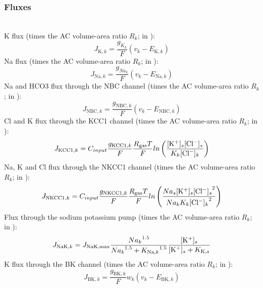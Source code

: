 \subsubsection*{Fluxes}\label{sec:EqNeAcflux}~\\ 
%
\gls{K} flux (times the AC volume-area ratio $R_k$; in \uMmps): 
\begin{equation} \label{eq:J_K}
J_{\text{K},k}=\frac{g_{K_{k}}}{F}(v_k - E_{\text{K},k})
\end{equation}
%
\gls{Na} flux (times the AC volume-area ratio $R_k$; in \uMmps):
\begin{equation} \label{eq:J_Na}
J_{\text{Na},k}=\frac{g_{Na_{k}}}{F}(v_k - E_{\text{Na},k})
\end{equation}
%
\gls{Na} and \gls{HCO3} flux through the NBC channel  (times the AC volume-area ratio $R_k$; in \uMmps): 
\begin{equation} \label{eq:J_NBC}
J_{\text{NBC},k}=\frac{g_{\text{NBC},k}}{F}\left(  v_k -E_{\text{NBC},k}  \right)
\end{equation}
%
\gls{Cl} and \gls{K} flux through the KCC1 channel  (times the AC volume-area ratio $R_k$; in \uMmps): 
\begin{equation} \label{eq:J_KCC1}
J_{\text{KCC1},k}=C_{input}\frac{g_{\text{KCC1},k}}{F}\frac{R_{\text{gas}}T}{F}ln \left(\frac{[\text{K$^+$}]_s [\text{Cl$^-$}]_s }{K_k [\text{Cl$^-$}]_k}\right)
\end{equation}
%
\gls{Na}, \gls{K} and \gls{Cl} flux through the NKCC1 channel   (times the AC volume-area ratio $R_k$; in \uMmps): 
\begin{equation} \label{eq:J_NKCC1}
J_{\text{NKCC1},k}=C_{input}\frac{g_{\text{NKCC1},k}}{F}\frac{R_{\text{gas}}T}{F}ln \left(\frac{Na_s [\text{K$^+$}]_s {[\text{Cl$^-$}]_s}^2}{Na_k K_k {[\text{Cl$^-$}]_k}^2}\right)
\end{equation}
%
Flux through the sodium potassium pump   (times the \gls{AC} volume-area ratio $R_k$; in \uMmps): 
\begin{equation} \label{eq:J_NaK_s}
J_{\text{NaK},k}=J_{\text{NaK,max}}\frac{{Na_k}^{1.5}}{{Na_k}^{1.5}+{K_{\text{Na},k}}^{1.5}}\frac{[\text{K$^+$}]_s}{[\text{K$^+$}]_s+K_{\text{K},s}}
\end{equation}
%
\gls{K} flux through the BK channel  (times the \gls{AC} volume-area ratio $R_k$; in \uMmps): 
\begin{equation} \label{eq:J_BK}
J_{\text{BK},k}=\frac{g_{\text{BK},k}}{F}w_k \left(v_k - E_{\text{BK},k} \right)
\end{equation}
%
%
%
